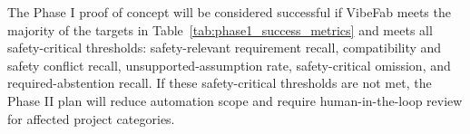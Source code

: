 




The Phase I proof of concept will be considered successful if VibeFab meets the majority of the targets in Table~\ref{tab:phase1_success_metrics} and meets all safety-critical thresholds: safety-relevant requirement recall, compatibility and safety conflict recall, unsupported-assumption rate, safety-critical omission, and required-abstention recall. If these safety-critical thresholds are not met, the Phase II plan will reduce automation scope and require human-in-the-loop review for affected project categories.

